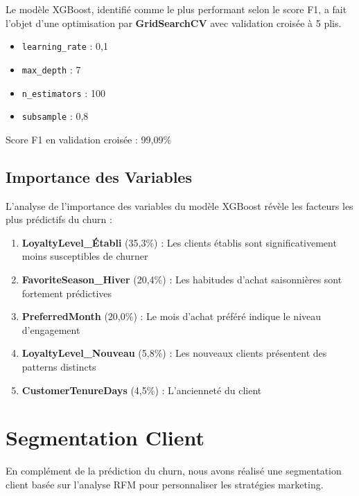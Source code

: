 \documentclass[11pt,a4paper]{article}
\begin{document}
Le modèle XGBoost, identifié comme le plus performant selon le score F1, a fait l'objet d'une optimisation par \textbf{GridSearchCV} avec validation croisée à 5 plis.

\begin{tcolorbox}[title=Hyperparamètres optimaux - XGBoost, colback=white, colframe=black]
\begin{itemize}
    \item \texttt{learning\_rate} : 0,1
    \item \texttt{max\_depth} : 7
    \item \texttt{n\_estimators} : 100
    \item \texttt{subsample} : 0,8
\end{itemize}
Score F1 en validation croisée : 99,09\%
\end{tcolorbox}

\subsection{Importance des Variables}

L'analyse de l'importance des variables du modèle XGBoost révèle les facteurs les plus prédictifs du churn :

\begin{enumerate}
    \item \textbf{LoyaltyLevel\_Établi} (35,3\%) : Les clients établis sont significativement moins susceptibles de churner
    \item \textbf{FavoriteSeason\_Hiver} (20,4\%) : Les habitudes d'achat saisonnières sont fortement prédictives
    \item \textbf{PreferredMonth} (20,0\%) : Le mois d'achat préféré indique le niveau d'engagement
    \item \textbf{LoyaltyLevel\_Nouveau} (5,8\%) : Les nouveaux clients présentent des patterns distincts
    \item \textbf{CustomerTenureDays} (4,5\%) : L'ancienneté du client
\end{enumerate}

\section{Segmentation Client}

En complément de la prédiction du churn, nous avons réalisé une segmentation client basée sur l'analyse RFM pour personnaliser les stratégies marketing.
\end{document}
